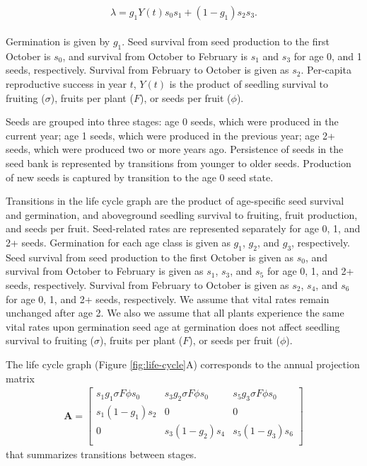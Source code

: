 \documentclass[12pt, oneside]{article}   	%
\begin{document}
 \begin{align}
  \begin{split}
\lambda = g_1Y(t) s_0 s_1 + (1-g_1) s_2 s_3.  \label{eq:di-equation}
  \end{split}
\end{align}

Germination is given by $g_1$. Seed survival from seed production to the first October is $s_0$, and survival from October to February is $s_1$ and $s_3$ for age 0, and 1 seeds, respectively. Survival from February to October is given as $s_2$. Per-capita reproductive success in year $t$, $Y(t)$ is the product of seedling survival to fruiting ($\sigma$), fruits per plant ($F$), or seeds per fruit ($\phi$).

\iffalse
 Seeds are grouped into three stages: age 0 seeds, which were produced in the current year; age 1 seeds, which were produced in the previous year; age 2+ seeds, which were produced two or more years ago. Persistence of seeds in the seed bank is represented by transitions from younger to older seeds. Production of new seeds is captured by transition to the age 0 seed state. 
 
Transitions in the life cycle graph are the product of age-specific seed survival and germination, and aboveground seedling survival to fruiting, fruit production, and seeds per fruit. Seed-related rates are represented separately for age 0, 1, and 2+ seeds. Germination for each age class is given as $g_1$, $g_2$, and $g_3$, respectively. Seed survival from seed production to the first October is given as $s_0$, and survival from October to February is given as $s_1$, $s_3$, and $s_5$ for age 0, 1, and 2+ seeds, respectively. Survival from February to October is given as $s_2$, $s_4$, and $s_6$ for age 0, 1, and 2+ seeds, respectively. We assume that vital rates remain unchanged after age 2. We also we assume that all plants experience the same vital rates upon germination seed age at germination does not affect seedling survival to fruiting ($\sigma$), fruits per plant ($F$), or seeds per fruit ($\phi$).

The life cycle graph (Figure \ref{fig:life-cycle}A) corresponds to the annual projection matrix
%
\begin{gather}
\bm{A} = 
\begin{bmatrix} 
s_1 g_1 \sigma F \phi s_0 & s_3 g_2 \sigma F \phi s_0 & s_5 g_3 \sigma F \phi s_0 \\
s_1 (1-g_1) s_2 & 0 & 0 \\
0 & s_3 (1-g_2) s_4  & s_5 (1-g_3) s_6  \\
\end{bmatrix}
\label{eq:projection-matrix}
\end{gather} 
%
that summarizes transitions between stages. 
\end{document}
